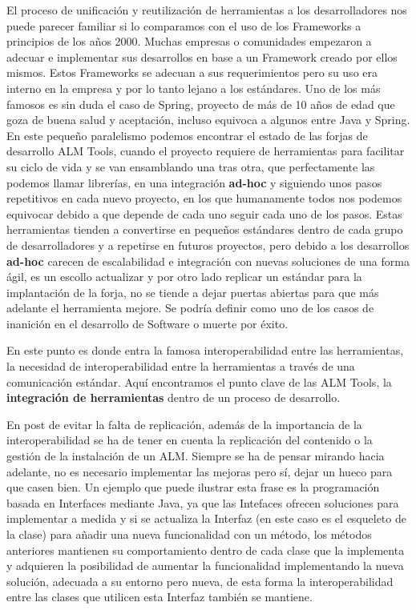 \documentclass[11pt]{scrartcl}
\begin{document}
\par El proceso de unificación y reutilización de herramientas a los desarrolladores nos puede parecer familiar si lo comparamos con el uso de los Frameworks a principios de los años 2000. Muchas empresas o comunidades empezaron a adecuar e implementar sus desarrollos en base a un Framework creado por ellos mismos. Estos Frameworks se adecuan a sus requerimientos pero su uso era interno en la empresa y por lo tanto lejano a los estándares. Uno de los más famosos es sin duda el caso de Spring, proyecto de más de 10 años de edad que goza de buena salud y aceptación, incluso equivoca a algunos entre Java y Spring. En este pequeño paralelismo podemos encontrar el estado de las forjas de desarrollo ALM Tools, cuando el proyecto requiere de herramientas para facilitar su ciclo de vida y se van ensamblando una tras otra, que perfectamente las podemos llamar librerías, en una integración \textbf{ad-hoc} y siguiendo unos pasos repetitivos en cada nuevo proyecto, en los que humanamente todos nos podemos equivocar debido a que depende de cada uno seguir cada uno de los pasos. Estas herramientas tienden a convertirse en pequeños estándares dentro de cada grupo de desarrolladores y a repetirse en futuros proyectos, pero debido a los desarrollos \textbf{ad-hoc} carecen de escalabilidad e integración con nuevas soluciones de una forma ágil, es un escollo actualizar y por otro lado replicar un estándar para la implantación de la forja, no se tiende a dejar puertas abiertas para que más adelante el herramienta mejore. Se podría definir como uno de los casos de inanición en el desarrollo de Software o muerte por éxito.

\par En este punto es donde entra la famosa interoperabilidad entre las herramientas, la necesidad de interoperabilidad entre la herramientas a través de una comunicación estándar. Aquí encontramos el punto clave de las ALM Tools, la \textbf{integración de herramientas} dentro de un proceso de desarrollo.

\par En post de evitar la falta de replicación, además de la importancia de la interoperabilidad se ha de tener en cuenta la replicación del contenido o la gestión de la instalación de un ALM. Siempre se ha de pensar mirando hacia adelante, no es necesario implementar las mejoras pero sí, dejar un hueco para que casen bien. Un ejemplo que puede ilustrar esta frase es la programación basada en Interfaces mediante Java, ya que las Intefaces ofrecen soluciones para implementar a medida y si se actualiza la Interfaz (en este caso es el esqueleto de la clase) para añadir una nueva funcionalidad con un método, los métodos anteriores mantienen su comportamiento dentro de cada clase que la implementa y adquieren la posibilidad de aumentar la funcionalidad implementando la nueva solución, adecuada a su entorno pero nueva, de esta forma la interoperabilidad entre las clases que utilicen esta Interfaz también se mantiene.
\end{document}
